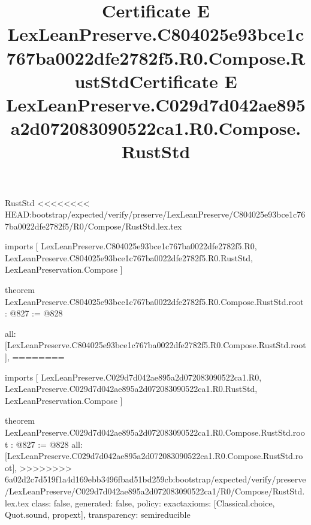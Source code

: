 \begin{lexlean}{RustStd}
<<<<<<<< HEAD:bootstrap/expected/verify/preserve/LexLeanPreserve/C804025e93bce1c767ba0022dfe2782f5/R0/Compose/RustStd.lex.tex
\title{Certificate E LexLeanPreserve.C804025e93bce1c767ba0022dfe2782f5.R0.Compose.RustStd}
\begin{coremodule}
imports [
  LexLeanPreserve.C804025e93bce1c767ba0022dfe2782f5.R0,
  LexLeanPreserve.C804025e93bce1c767ba0022dfe2782f5.R0.RustStd,
  LexLeanPreservation.Compose
]

theorem LexLeanPreserve.C804025e93bce1c767ba0022dfe2782f5.R0.Compose.RustStd.root : @827 := @828 {
  all: [LexLeanPreserve.C804025e93bce1c767ba0022dfe2782f5.R0.Compose.RustStd.root],
========
\title{Certificate E LexLeanPreserve.C029d7d042ae895a2d072083090522ca1.R0.Compose.RustStd}
\begin{coremodule}
imports [
  LexLeanPreserve.C029d7d042ae895a2d072083090522ca1.R0,
  LexLeanPreserve.C029d7d042ae895a2d072083090522ca1.R0.RustStd,
  LexLeanPreservation.Compose
]

theorem LexLeanPreserve.C029d7d042ae895a2d072083090522ca1.R0.Compose.RustStd.root : @827 := @828 {
  all: [LexLeanPreserve.C029d7d042ae895a2d072083090522ca1.R0.Compose.RustStd.root],
>>>>>>>> 6a02d2c7d519f1a4d169ebb3496fbad51bd259cb:bootstrap/expected/verify/preserve/LexLeanPreserve/C029d7d042ae895a2d072083090522ca1/R0/Compose/RustStd.lex.tex
  class: false,
  generated: false,
  policy: exact{axioms: [Classical.choice, Quot.sound, propext]},
  transparency: semireducible
}


\end{coremodule}}
\end{coremodule}
\end{lexlean}
